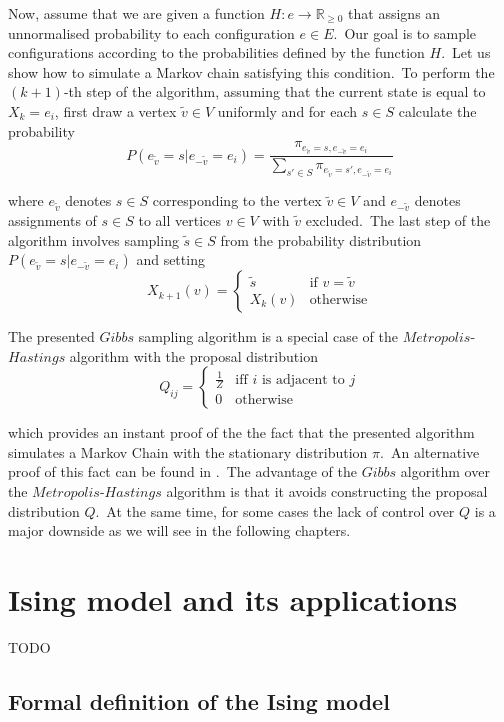 \documentclass[a4paper, 11pt, onecolumn, openany, titlepage]{report}
\newcommand\numberedchapter[1]{\setlength\topskip{3cm}\chapter{#1}\setlength\topskip{0cm}}
\theoremstyle{default_theorem_style}\newtheorem{theorem}{Theorem}
\theoremstyle{default_theorem_style}\newtheorem{definition}{Definition}
\begin{document}
Now, assume that we are given a function $H : e \to \mathbb R_{\geq 0}$ that assigns an unnormalised probability to
each configuration $e \in E$.\ Our goal is to sample configurations according to the probabilities defined by the
function $H$.\ Let us show how to simulate a Markov chain satisfying this condition.\ To perform the $(k + 1)$-th
step of the algorithm, assuming that the current state is equal to $X_k = e_i$, first draw a vertex $\tilde{v} \in V$
uniformly and for each $s \in S$ calculate the probability
$$
P(e_{\tilde{v}} = s | e_{-\tilde{v}} = e_i) = \frac{\pi_{e_{\tilde{v}} =
s,e_{-\tilde{v}} = e_i}}{\sum_{s' \in S} \pi_{e_{\tilde{v}} = s', e_{-\tilde{v}} = e_i}}
$$

where $e_{\tilde{v}}$ denotes $s \in S$ corresponding to the vertex $\tilde{v} \in V$ and $e_{-\tilde{v}}$
denotes assignments of $s \in S$ to  all vertices $v \in V$ with $\tilde{v}$ excluded.\ The last step of the algorithm
involves sampling $\tilde{s} \in S$ from the probability distribution $P(e_{\tilde{v}} = s | e_{-\tilde{v}} = e_i)$
and setting
$$
X_{k + 1}(v) =
\begin{cases}
  \tilde{s} &\text{if $v = \tilde{v}$}\\
  X_k(v) &\text{otherwise}
\end{cases}
$$

The presented $Gibbs$ sampling algorithm is a special case of the $Metropolis$-$Hastings$ algorithm with the proposal
distribution
$$
Q_{ij} =
\begin{cases}
  \frac{1}{Z} &\text{iff $i$ is adjacent to $j$}\\
  0 &\text{otherwise}
\end{cases}
$$

which provides an instant proof of the the fact that the presented algorithm simulates a Markov Chain with the
stationary distribution $\pi$.\ An alternative proof of this fact can be found in \cite{mcmc_book}.\ The advantage of
the $Gibbs$ algorithm over the $Metropolis$-$Hastings$ algorithm is that it avoids constructing  the proposal
distribution $Q$.\ At the same time, for some cases the lack of control over $Q$ is a major downside as we will see
in the following chapters.

\numberedchapter{Ising model and its applications}

TODO

\section{Formal definition of the Ising model}
\end{document}
